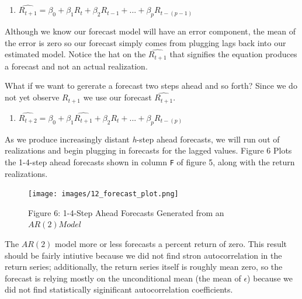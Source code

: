 \documentclass[
]{book}
\providecommand{\tightlist}{%
  \setlength{\itemsep}{0pt}\setlength{\parskip}{0pt}}
\begin{document}
\begin{enumerate}
\def\labelenumi{\arabic{enumi}.}
\setcounter{enumi}{3}
\tightlist
\item
  \(\hat{R_{t+1}} = \beta_0 + \beta_1R_{t} + \beta_2R_{t-1}+ ... + \beta_{p}R_{t-(p-1)}\)
\end{enumerate}

Although we know our forecast model will have an error component, the mean of the error is zero so our forecast simply comes from plugging lags back into our estimated model. Notice the hat on the \(\hat{R_{t+1}}\) that signifies the equation produces a forecast and not an actual realization.

What if we want to gererate a forecast two steps ahead and so forth? Since we do not yet observe \(R_{t+1}\) we use our forecast \(\hat{R_{t+1}}\).

\begin{enumerate}
\def\labelenumi{\arabic{enumi}.}
\setcounter{enumi}{4}
\tightlist
\item
  \(\hat{R_{t+2}} = \beta_0 + \beta_1\hat{R_{t+1}} + \beta_2R_{t}+ ... + \beta_{p}R_{t-(p)}\)
\end{enumerate}

As we produce increasingly distant \emph{h}-step ahead forecasts, we will run out of realizations and begin plugging in forecasts for the lagged values. Figure 6 Plots the 1-4-step ahead forecasts shown in column \texttt{F} of figure 5, along with the return realizations.

\begin{figure}
\centering
\texttt{[image: images/12\_forecast\_plot.png]}
\caption{Figure 6: 1-4-Step Ahead Forecasts Generated from an \(AR(2) Model\)}
\end{figure}

The \(AR(2)\) model more or less forecasts a percent return of zero. This result should be fairly intiutive because we did not find stron autocorrelation in the return series; additionally, the return series itself is roughly mean zero, so the forecast is relying mostly on the unconditional mean (the mean of \(\epsilon\)) because we did not find statistically siginificant autocorrelation coefficients.
\end{document}
